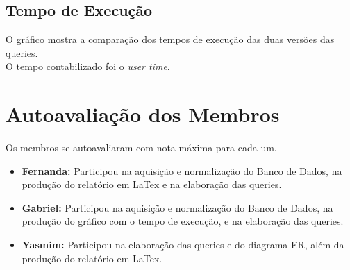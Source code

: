 \documentclass{article}
\begin{document}
\pagebreak

\subsection{Tempo de Execução}
O gráfico mostra a comparação dos tempos de execução das duas versões das queries. \\
O tempo contabilizado foi o \textit{user time}.
\begin{figure}[H]
  \begin{center}  
        
  \end{center}  
  \label{fig:graph}
\end{figure}

\section{Autoavaliação dos Membros}
Os membros se autoavaliaram com nota máxima para cada um.
\begin{itemize}
\item \textbf{Fernanda:} Participou na aquisição e normalização do Banco de Dados, na produção do relatório em LaTex e na elaboração das queries.
\item \textbf{Gabriel:} Participou na aquisição e normalização do Banco de Dados, na produção do gráfico com o tempo de execução, e na elaboração das queries.
\item \textbf{Yasmim:} Participou na elaboração das queries e do diagrama ER, além da produção do relatório em LaTex.
\end{itemize}




\end{document}
